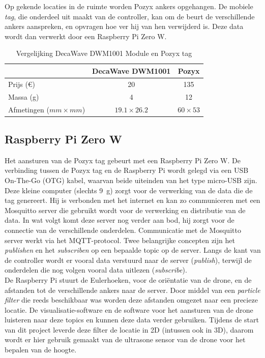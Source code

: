 Op gekende locaties in de ruimte worden Pozyx ankers opgehangen. De mobiele \textit{tag}, die onderdeel uit maakt van de controller, kan om de beurt de verschillende ankers aanspreken, en opvragen hoe ver hij van hen verwijderd is. Deze data wordt dan verwerkt door een Raspberry Pi Zero W.\\

\begin{table}[p]
	\centering
	\begin{tabular}{ | l | c | c | } \hline
		& DecaWave DWM1001 & Pozyx \\
		\hline 
		\hline
		Prijs (\euro{}) & 20 & 135 \\ 
		\hline
		Massa (g) & 4 & 12 \\ 
		\hline
		Afmetingen ($mm \times mm$) & $19.1 \times 26.2$ & $60 \times 53$ \\ 
		\hline
	\end{tabular}
	\caption[Vergelijking DecaWave DWM1001 Module en Pozyx tag]{Vergelijking DecaWave DWM1001 Module en Pozyx tag}
	\label{tab:decavspozyx}
\end{table}

\subsection{Raspberry Pi Zero W} \label{sec:zerow}
Het aansturen van de Pozyx tag gebeurt met een Raspberry Pi Zero W.
De verbinding tussen de Pozyx tag en de Raspberry Pi wordt gelegd via een USB On-The-Go (OTG) kabel, waarvan beide uiteinden van het type micro-USB zijn.
Deze kleine computer (slechts \SI{9}{\g}) zorgt voor de verwerking van de data die de tag genereert.
Hij is verbonden met het internet en kan zo communiceren met een Mosquitto server die gebruikt wordt voor de verwerking en distributie van de data.
In wat volgt komt deze server nog verder aan bod, hij zorgt voor de connectie van de verschillende onderdelen.
Communicatie met de Mosquitto server werkt via het MQTT-protocol.
Twee belangrijke concepten zijn het \textit{publishen} en het \textit{subscriben} op een bepaalde topic op de server.
Langs de kant van de controller wordt er vooral data verstuurd naar de server (\textit{publish}), terwijl de onderdelen die nog volgen vooral data uitlezen (\textit{subscribe}).\\

De Raspberry Pi stuurt de Eulerhoeken, voor de ori\"entatie van de drone, en de afstanden tot de verschillende ankers naar de server. Door middel van een \textit{particle filter} die reeds beschikbaar was worden deze afstanden omgezet naar een precieze locatie. De visualisatie-software en de software voor het aansturen van de drone luisteren naar deze topics en kunnen deze data verder gebruiken.
Tijdens de start van dit project leverde deze filter de locatie in 2D (intussen ook in 3D), daarom wordt er hier gebruik gemaakt van de ultrasone sensor van de drone voor het bepalen van de hoogte.\\

